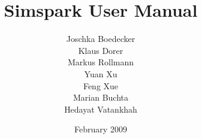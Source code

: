 

\author{Joschka Boedecker \\ Klaus Dorer \\ Markus Rollmann \\ Yuan Xu
\\ Feng Xue \\ Marian Buchta \\ Hedayat Vatankhah}
\title{Simspark User Manual}

\date{February 2009}



\maketitle
\cleardoublepage
\pagestyle{fancy}


\setlength{\headheight}{14pt}
\setlength{\parindent}{0.7cm}

\frontmatter
\tableofcontents
\mainmatter












\backmatter




\printindex 


